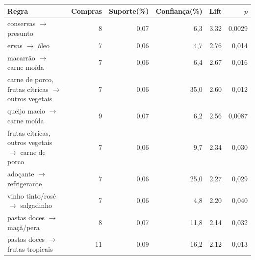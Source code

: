 \begin{tabularx}{\textwidth}{XrRRrr}
\toprule
Regra & Compras & Suporte\newline(\%) & Confiança\newline(\%) & Lift & $p$ \\
\midrule
conservas $\rightarrow$ presunto & 8 & 0,07 & 6,3 & 3,32 & 0,0029 \\
ervas $\rightarrow$ óleo & 7 & 0,06 & 4,7 & 2,76 & 0,014 \\
macarrão $\rightarrow$ carne moída & 7 & 0,06 & 6,4 & 2,67 & 0,016 \\
carne de porco, frutas cítricas $\rightarrow$ outros vegetais & 7 & 0,06 & 35,0 & 2,60 & 0,012 \\
queijo macio $\rightarrow$ carne moída & 9 & 0,07 & 6,2 & 2,56 & 0,0087 \\
frutas cítricas, outros vegetais $\rightarrow$ carne de porco & 7 & 0,06 & 9,7 & 2,34 & 0,030 \\
adoçante $\rightarrow$ refrigerante & 7 & 0,06 & 25,0 & 2,27 & 0,029 \\
vinho tinto/rosé $\rightarrow$ salgadinho & 7 & 0,06 & 4,8 & 2,20 & 0,040 \\
pastas doces $\rightarrow$ maçã/pera & 8 & 0,07 & 11,8 & 2,14 & 0,032 \\
pastas doces $\rightarrow$ frutas tropicais & 11 & 0,09 & 16,2 & 2,12 & 0,013 \\
\bottomrule
\end{tabularx}
